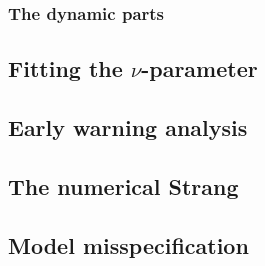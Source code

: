 \subsubsection{The dynamic parts}

\subsection{Fitting the $\nu$-parameter}

\subsection{Early warning analysis}

\subsection{The numerical Strang}

\subsection{Model misspecification}